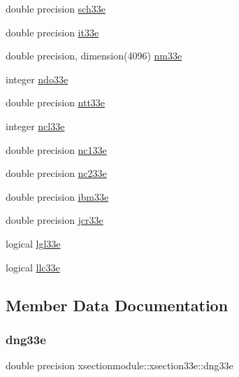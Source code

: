 \begin{DoxyCompactItemize}
\item 
double precision \hyperlink{structxsectionmodule_1_1xsection33e_aa18b51a36172fda3c5598e4bac3d3604}{sch33e}
\item 
double precision \hyperlink{structxsectionmodule_1_1xsection33e_ae4cf4366fa9e60f91df3f365271dce23}{it33e}
\item 
double precision, dimension(4096) \hyperlink{structxsectionmodule_1_1xsection33e_a65da0cbcc8b3c4aa2ff888bb630c6220}{nm33e}
\item 
integer \hyperlink{structxsectionmodule_1_1xsection33e_a33f42ea410c793efa427384afc022e7f}{ndo33e}
\item 
double precision \hyperlink{structxsectionmodule_1_1xsection33e_a3f09a6b38ff0574f8c60f83a41a4e0a5}{ntt33e}
\item 
integer \hyperlink{structxsectionmodule_1_1xsection33e_a098537ee28b0708d0eb31022bd147183}{ncl33e}
\item 
double precision \hyperlink{structxsectionmodule_1_1xsection33e_a7004b58dfe829e87967c2a5e35237577}{nc133e}
\item 
double precision \hyperlink{structxsectionmodule_1_1xsection33e_a686d64e56198539f32315d9bc3e59cd8}{nc233e}
\item 
double precision \hyperlink{structxsectionmodule_1_1xsection33e_aab6054cf2ea744b5b680b6e434393fc5}{ibm33e}
\item 
double precision \hyperlink{structxsectionmodule_1_1xsection33e_ae659b4a794d1fba1097e3e4abf2eb4c8}{jcr33e}
\item 
logical \hyperlink{structxsectionmodule_1_1xsection33e_aa4c3cf663f4575d70646f3ab63f480d0}{lgl33e}
\item 
logical \hyperlink{structxsectionmodule_1_1xsection33e_a66dc2686b56de01787487c65c25ef1ca}{llc33e}
\end{DoxyCompactItemize}


\subsection{Member Data Documentation}
\mbox{\label{structxsectionmodule_1_1xsection33e_a0603a40daac8788845550d1a88bc5bac}} 
\subsubsection{\texorpdfstring{dng33e}{dng33e}}
{\footnotesize\ttfamily double precision xsectionmodule\+::xsection33e\+::dng33e}

